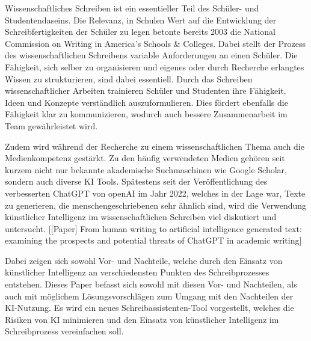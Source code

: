 \documentclass[../main.tex]{subfiles}
\begin{document}
Wissenschaftliches Schreiben ist ein essentieller Teil des Schüler- und Studentendaseins. 
Die Relevanz, in Schulen Wert auf die Entwicklung der Schreibfertigkeiten der Schüler zu legen betonte bereits 2003 
die National Commission on Writing in America’s Schools \& Colleges. Dabei stellt der Prozess des 
wissenschaftlichen Schreibens variable Anforderungen an einen Schüler. Die Fähigkeit, sich selber zu organisieren und 
eigenes oder durch Recherche erlangtes Wissen zu strukturieren, sind dabei essentiell. Durch das Schreiben 
wissenschaftlicher Arbeiten trainieren Schüler und Studenten ihre Fähigkeit, Ideen und Konzepte verständlich 
auszuformulieren. Dies fördert ebenfalls die Fähigkeit klar zu kommunizieren, wodurch auch bessere Zusammenarbeit 
im Team gewährleistet wird.  

Zudem wird während der Recherche zu einem wissenschaftlichen Thema auch die Medienkompetenz gestärkt. Zu den häufig 
verwendeten Medien gehören seit kurzem nicht nur bekannte akademische Suchmaschinen wie Google Scholar, sondern auch 
diverse KI Tools. Spätestens seit der Veröffentlichung des verbesserten ChatGPT von openAI im Jahr 2022, welches in der 
Lage war, Texte zu generieren, die menschengeschriebenen sehr ähnlich sind, wird die Verwendung künstlicher Intelligenz 
im wissenschaftlichen Schreiben viel diskutiert und untersucht. [[Paper] From human writing to artificial intelligence generated text: examining the prospects and potential threats of ChatGPT in academic writing]

Dabei zeigen sich sowohl Vor- und Nachteile, welche durch den Einsatz von künstlicher Intelligenz an 
verschiedensten Punkten des Schreibprozesses entstehen. 
Dieses Paper befasst sich sowohl mit diesen Vor- und Nachteilen, als auch mit möglichem 
Lösungsvorschlägen zum Umgang mit den Nachteilen der KI-Nutzung. Es wird ein neues Schreibassistenten-Tool vorgestellt, welches die Risiken 
von KI minimieren und den Einsatz von künstlicher Intelligenz im Schreibprozess vereinfachen soll.
\end{document}
